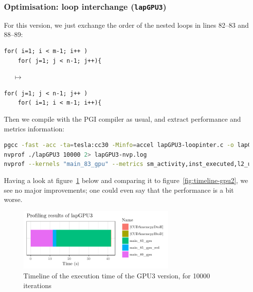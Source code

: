 \subsubsection{Optimisation: loop interchange (\texttt{lapGPU3})}
For this version, we just exchange the order of the nested loops in lines \numrange{82}{83} and \numrange{88}{89}:
\begin{minipage}{.45\textwidth}
\begin{lstlisting}[firstnumber=81]
for( i=1; i < m-1; i++ )
	for( j=1; j < n-1; j++){
\end{lstlisting}
\end{minipage}%
\begin{minipage}{0.1\textwidth}
$\,\,\quad\mapsto$
\end{minipage}%
\begin{minipage}{0.45\textwidth}
\begin{lstlisting}[firstnumber=81]
for( j=1; j < n-1; j++ )
	for( i=1; i < m-1; i++){
\end{lstlisting}
\end{minipage}

Then we compile with the PGI compiler as usual, and extract performance and metrics information:
\begin{lstlisting}[language=bash]
pgcc -fast -acc -ta=tesla:cc30 -Minfo=accel lapGPU3-loopinter.c -o lapGPU3 &> lapGPU3-comp.log
nvprof ./lapGPU3 10000 2> lapGPU3-nvp.log
nvprof --kernels "main_83_gpu" --metrics sm_activity,inst_executed,l2_utilization, dram_utilization,dram_read_throughput,dram_write_throughput,ipc ./lapGPU3 100 2> lapGPU3-metrics.log
\end{lstlisting}

Having a look at figure~\ref{fig:timeline-gpu3} below and comparing it to figure~\ref{fig:timeline-gpu2}, we see no major improvements; one could even say that the performance is a bit worse.
\begin{figure}[H]
	\centering
	\includegraphics[width=0.7\textwidth]{images/timeline-gpu3}
	\caption{Timeline of the execution time of the GPU3 version, for \num{10000} iterations}
	\label{fig:timeline-gpu3}
\end{figure}

